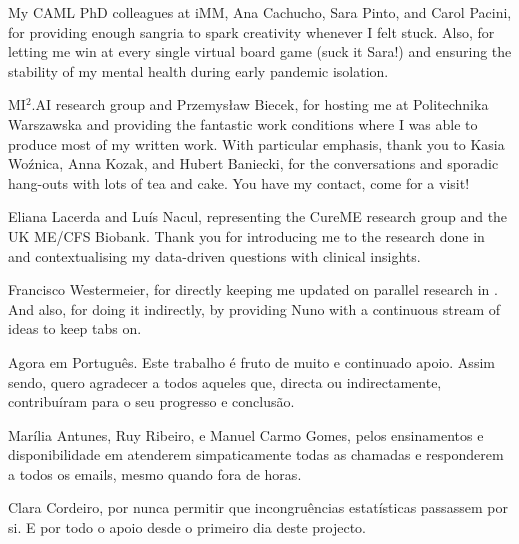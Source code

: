 My CAML PhD colleagues at iMM, Ana Cachucho, Sara Pinto, and Carol Pacini, for providing enough sangria to spark creativity whenever I felt stuck.
Also, for letting me win at every single virtual board game (suck it Sara!) and ensuring the stability of my mental health during early pandemic isolation.

MI$^2$.AI research group and Przemys\l{}aw Biecek, for hosting me at Politechnika Warszawska and providing the fantastic work conditions where I was able to produce most of my written work.
With particular emphasis, thank you to Kasia Wo\'{z}nica, Anna Kozak, and Hubert Baniecki, for the conversations and sporadic hang-outs with lots of tea and cake. You have my contact, come for a visit!

Eliana Lacerda and Luís Nacul, representing the CureME research group and the UK ME/CFS Biobank.
Thank you for introducing me to the research done in \cfs and contextualising my data-driven questions with clinical insights.

Francisco Westermeier, for directly keeping me updated on parallel research in \cfs. And also, for doing it indirectly, by providing Nuno with a continuous stream of ideas to keep tabs on.

\bsni
Agora em Português.
Este trabalho é fruto de muito e continuado apoio.
Assim sendo, quero agradecer a todos aqueles que, directa ou indirectamente, contribuíram para o seu progresso e conclusão.

Marília Antunes, Ruy Ribeiro, e Manuel Carmo Gomes, pelos ensinamentos e disponibilidade em atenderem simpaticamente todas as chamadas e responderem a todos os emails, mesmo quando fora de horas.

Clara Cordeiro, por nunca permitir que incongruências estatísticas passassem por si. E por todo o apoio desde o primeiro dia deste projecto.

